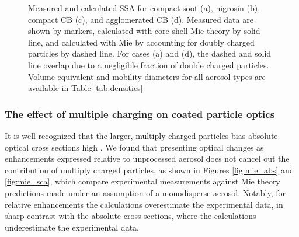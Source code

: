 \begin{figure}[htp]
{
    }
    \caption{Measured and calculated SSA for compact soot (a), nigrosin (b), compact CB (c), and agglomerated CB (d). Measured data are shown by markers, calculated with core-shell Mie theory  by solid line, and calculated with Mie by accounting for doubly charged particles by dashed line. For cases (a) and (d), the dashed and solid line overlap due to a negligible fraction of double charged particles. Volume equivalent and mobility diameters for all aerosol types are available in Table \ref{tab:densities}}
    \label{fig:ssa}
\end{figure}


\subsubsection{The effect of multiple charging on coated particle optics}

It is well recognized that the larger, multiply charged particles bias absolute optical cross sections high \citep{RN7,RN67}. We found that presenting optical changes as enhancements expressed relative to unprocessed aerosol does not cancel out the contribution of multiply charged particles, as shown in Figures \ref{fig:mie_abs} and \ref{fig:mie_sca}, which compare experimental measurements against Mie theory predictions made under an assumption of a monodisperse aerosol. Notably, for relative enhancements the calculations overestimate the experimental data, in sharp contrast with the absolute cross sections, where the calculations underestimate the experimental data.

